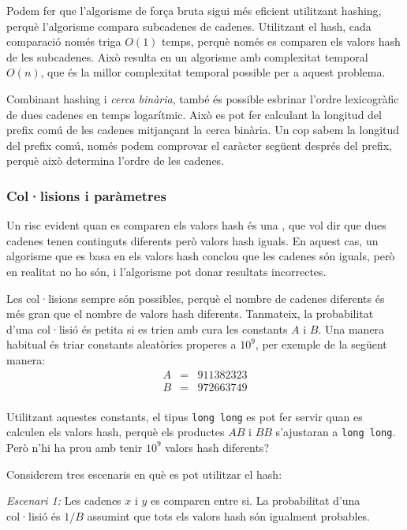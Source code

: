 Podem fer que l'algorisme de força bruta sigui més eficient utilitzant
hashing, perquè l'algorisme compara subcadenes de cadenes. Utilitzant
el hash, cada comparació només triga $O(1)$ temps, perquè només es
comparen els valors hash de les subcadenes. Això resulta en un
algorisme amb complexitat temporal $O(n)$, que és la millor
complexitat temporal possible per a aquest problema.

Combinant hashing i \emph{cerca binària}, també és possible esbrinar
l'ordre lexicogràfic de dues cadenes en temps logarítmic. Això es pot
fer calculant la longitud del prefix comú de les cadenes mitjançant la
cerca binària. Un cop sabem la longitud del prefix comú, només podem
comprovar el caràcter següent després del prefix, perquè això
determina l'ordre de les cadenes.

\subsubsection*{Col·lisions i paràmetres}


Un risc evident quan es comparen els valors hash és una
, que vol dir que dues cadenes tenen continguts
diferents però valors hash iguals. En aquest cas, un algorisme que es
basa en els valors hash conclou que les cadenes són iguals, però en
realitat no ho són, i l'algorisme pot donar resultats incorrectes.

Les col·lisions sempre són possibles, perquè el nombre de cadenes
diferents és més gran que el nombre de valors hash
diferents. Tanmateix, la probabilitat d'una col·lisió és petita si es
trien amb cura les constants $A$ i $B$. Una manera habitual és triar
constants aleatòries properes a $10^9$, per exemple de la següent
manera:
\[
\begin{array}{lcl}
A & = & 911382323 \\
B & = & 972663749 \\
\end{array}
\]


Utilitzant aquestes constants, el tipus \texttt{long long} es pot
fer servir quan es calculen els valors hash, perquè els productes $AB$
i $BB$ s'ajustaran a \texttt{long long}. Però n'hi ha prou amb tenir
$10^9$ valors hash diferents?

Considerem tres escenaris en què es pot utilitzar el hash:

\textit{Escenari 1:} Les cadenes $x$ i $y$ es comparen entre si. La
probabilitat d'una col·lisió és $1/B$ assumint que tots els valors
hash són igualment probables.

